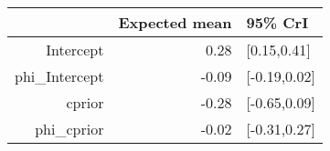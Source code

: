\begin{tabular}{rrl}
  \hline
 & Expected mean & 95\% CrI \\ 
  \hline
Intercept & 0.28 & [0.15,0.41] \\ 
  phi\_Intercept & -0.09 & [-0.19,0.02] \\ 
  cprior & -0.28 & [-0.65,0.09] \\ 
  phi\_cprior & -0.02 & [-0.31,0.27] \\ 
   \hline
\end{tabular}

